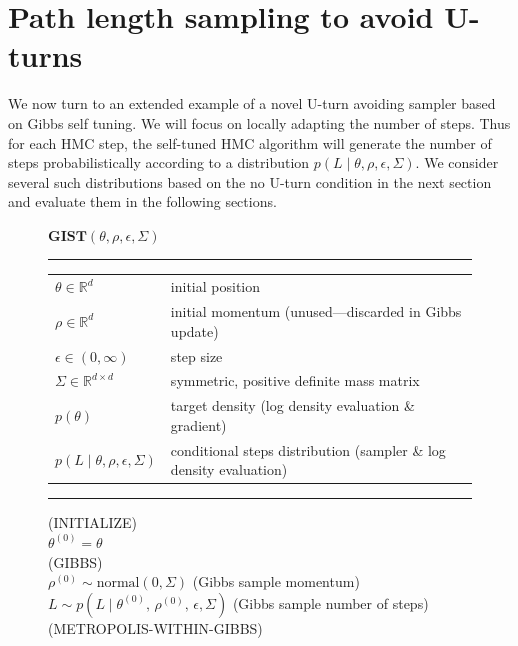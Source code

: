 \documentclass[letterpaper,11pt]{article}
\theoremstyle{plain}%
\theoremstyle{remark}
\begin{document}
\section{Path length sampling to avoid U-turns} \label{sec:step-distro} \label{sec:u-turn-avoiding}

We now turn to an extended example of a novel U-turn avoiding sampler based on Gibbs self tuning.  We will focus on locally adapting the number of steps.  Thus for each HMC step, the self-tuned HMC algorithm will generate the number of steps probabilistically according to a distribution $p(L \mid \theta, \rho, \epsilon, \Sigma)$.  We consider several such distributions based on the no U-turn condition in the next section and evaluate them in the following sections.

\newcommand{\pos}[2]{#1^{(#2)}}
\begin{figure}[t]
\small
\begin{flushleft}
$\textbf{GIST}(\theta, \rho, \epsilon, \Sigma)$
\vspace*{2pt}
\hrule
\vspace*{2pt}
\begin{tabular}{ll}
$\theta \in \mathbb{R}^d$ & initial position
\\[2pt]
$\rho \in \mathbb{R}^d$ & initial momentum (unused---discarded in Gibbs update)
\\[2pt]
$\epsilon \in (0, \infty)$ & step size
\\[2pt]
$\Sigma \in \mathbb{R}^{d \times d}$ & symmetric, positive definite mass matrix
\\[2pt]
$p(\theta)$ & target density (log density evaluation \& gradient)
\\[2pt]
$p(L \mid \theta, \rho, \epsilon, \Sigma)$ & conditional steps distribution (sampler \& log density evaluation)
\end{tabular}
\vspace*{4pt}
\hrule
\vspace*{6pt}
{\footnotesize (INITIALIZE)} \\[2pt]
$\pos{\theta}{0} = \theta$
\\[10pt]
{\footnotesize (GIBBS)} \\[2pt]
$\pos{\rho}{0} \sim \textrm{normal}(0, \Sigma)$ \hfill (Gibbs sample momentum)
\\[4pt]
$L \sim p(L \mid \pos{\theta}{0}\!,\, \pos{\rho}{0}\!,\, \epsilon, \Sigma)$ \hfill (Gibbs sample number of steps)
\\[10pt]
{\footnotesize (METROPOLIS-WITHIN-GIBBS)} \\[2pt]

\end{flushleft}
\end{figure}
\end{document}
